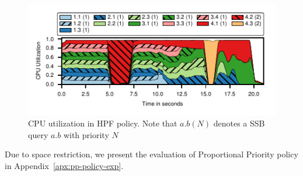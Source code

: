 \begin{figure}[t]
	\centering
	\includegraphics[width=\columnwidth]{figures/ssb-hpf-all.pdf}
	\vspace{-2.5em}
	\caption{CPU utilization in HPF policy. Note that $a.b  (N)$ denotes a SSB query $a.b$ with priority $N$}
	\vspace{-1em}
	\label{fig:hpf-all}
\end{figure}

Due to space restriction, we present the evaluation of Proportional Priority policy in Appendix~\ref{apx:pp-policy-exp}.
%
%
%
